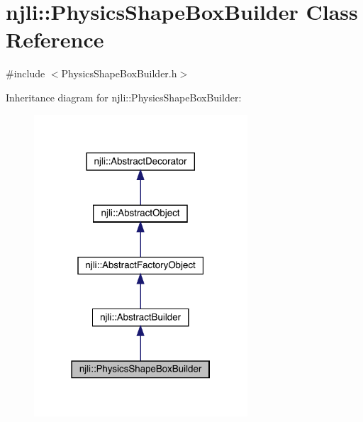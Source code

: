 \hypertarget{classnjli_1_1_physics_shape_box_builder}{}\section{njli\+:\+:Physics\+Shape\+Box\+Builder Class Reference}
\label{classnjli_1_1_physics_shape_box_builder}


{\ttfamily \#include $<$Physics\+Shape\+Box\+Builder.\+h$>$}



Inheritance diagram for njli\+:\+:Physics\+Shape\+Box\+Builder\+:\nopagebreak
\begin{figure}[H]
\begin{center}
\leavevmode
\includegraphics[width=226pt]{classnjli_1_1_physics_shape_box_builder__inherit__graph}
\end{center}
\end{figure}


